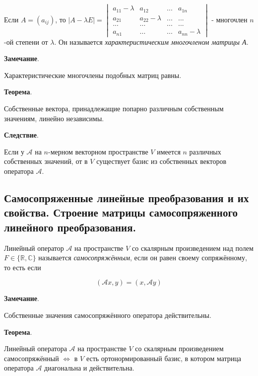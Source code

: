 \documentclass[a4paper]{article}
\begin{document}
Если $A = (a_{ij})$, то $|A-\lambda E| = \begin{vmatrix}
a_{11}-\lambda & a_{12} & ... & a_{1n}\\
a_{21} & a_{22}-\lambda & ... & ... \\
... & ... & ... & ... \\
a_{n1} & ... & ... & a_{nn} - \lambda
\end{vmatrix}$ - многочлен $n$-ой степени от $\lambda$. Он называется \textit{характеристическим многочленом матрицы А}.

\begin{htheorem}\textbf{Замечание}.

Характеристические многочлены подобных матриц равны.
\end{htheorem}

\begin{htheorem}\textbf{Теорема}.

Собственные вектора, принадлежащие попарно различным собственным значениям, линейно независимы.
\end{htheorem}

\begin{htheorem}\textbf{Следствие}.

Если у $\mathcal{A}$ на $n$-мерном векторном пространстве $V$ имеется $n$ различных собственных значений, от в $V$ существует базис из собственных векторов оператора $\mathcal{A}$.
\end{htheorem}

\subsection*{Самосопряженные линейные преобразования и их свойства. Строение матрицы самосопряженного линейного преобразования.}

Линейный оператор $\mathcal{A}$ на пространстве $V$ со скалярным произведением над полем $F \in \{ \mathbb{R}, \mathbb{C} \}$ называется \textit{самосопряжённым}, если он равен своему сопряжённому, то есть если

\[ ( \mathcal{A} x, y ) = (x, \mathcal{A} y) \]


\begin{htheorem}\textbf{Замечание}.

Собственные значения самосопряжённого оператора действительны.
\end{htheorem}

\begin{htheorem}\textbf{Теорема}.

Линейный оператора $\mathcal{A}$ на пространстве $V$ со скалярным произведением самосопряжённый $\Leftrightarrow$ в $V$ есть ортонормированный базис, в котором матрица оператора $\mathcal{A}$ диагональна и действительна.
\end{htheorem}
\end{document}
